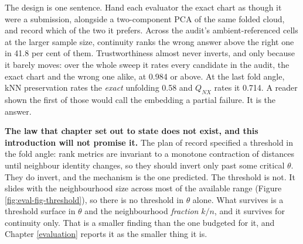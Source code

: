 \documentclass[
  british,
  a4paper,
]{book}
\newenvironment{Shaded}{\begin{snugshade}}{\end{snugshade}}
\newcommand{\FunctionTok}[1]{\textcolor[rgb]{0.13,0.29,0.53}{\textbf{#1}}}
\newcommand{\NormalTok}[1]{#1}
\newcommand{\OtherTok}[1]{\textcolor[rgb]{0.56,0.35,0.01}{#1}}
\newcommand{\SpecialCharTok}[1]{\textcolor[rgb]{0.81,0.36,0.00}{\textbf{#1}}}
\newcommand{\StringTok}[1]{\textcolor[rgb]{0.31,0.60,0.02}{#1}}
\begin{document}
\begin{Shaded}
\end{Shaded}

The design is one sentence. Hand each evaluator the exact chart as though it
were a submission, alongside a two-component PCA of the same folded cloud, and
record which of the two it prefers. Across the audit's ambient-referenced cells
at the larger sample size, continuity ranks the wrong answer above the right one
in 41.8 per cent of them. Trustworthiness almost
never inverts, and only because it barely moves: over the whole sweep it rates
every candidate in the audit, the exact chart and the wrong one alike, at
0.984 or above. At the last fold angle, kNN preservation rates
the \emph{exact} unfolding 0.58 and \(Q_{NX}\) rates it
0.714. A reader shown the first of those would call the
embedding a partial failure. It is the answer.

\textbf{The law that chapter set out to state does not exist, and this introduction
will not promise it.} The plan of record specified a threshold in the fold
angle: rank metrics are invariant to a monotone contraction of distances until
neighbour identity changes, so they should invert only past some critical
\(\theta\). They do invert, and the mechanism is the one predicted. The threshold
is not. It slides with the neighbourhood size across most of the available range
(Figure \ref{fig:eval-fig-threshold}), so there is no threshold in \(\theta\)
alone. What survives is a threshold surface in \(\theta\) and the neighbourhood
\emph{fraction} \(k/n\), and it survives for continuity only. That is a smaller finding
than the one budgeted for it, and Chapter \ref{evaluation} reports it as the
smaller thing it is.
\end{document}

